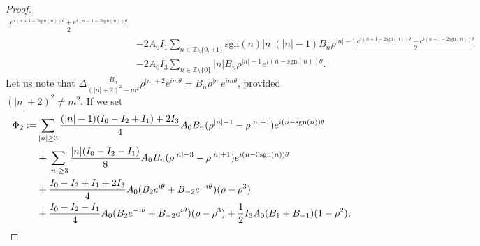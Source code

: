 \documentclass[10pt,a4paper]{amsart}
\begin{document}
\begin{proof}
\begin{equation*}
\begin{split}
\frac{e^{i(n+1-2\text{sgn}(n))\theta}+e^{i(n-1-2\text{sgn}(n))\theta}}{2}\\
&-2A_0I_1\sum_{n\in\mathbb{Z}\setminus\{0,\pm1\}}\text{sgn}(n)|n|(|n|-1)B_n\rho^{|n|-1}
\frac{e^{i(n+1-2\text{sgn}(n))\theta}-e^{i(n-1-2\text{sgn}(n))\theta}}{2}\\
&-2A_0I_3\sum_{n\in\mathbb{Z}\setminus\{0\}}|n|B_n\rho^{|n|-1}e^{i(n-\text{sgn}(n))\theta}.
\end{split}
\end{equation*}
Let us note that  $ \Delta \frac{B_n}{(|n|+2)^2-m^2}\rho^{|n|+2}e^{im\theta}=B_n\rho^{|n|}e^{im\theta}  $, provided $(|n|+2)^2\ne m^2$. 
If we set  
 \begin{align}\label{eq:Phi2}
 \Phi_2:=&\sum_{|n|\ge3}\frac{(|n|-1)(I_0-I_2+I_1)+2I_3}{4}A_0B_n
 (\rho^{|n|-1}-\rho^{|n|+1})e^{i(n-\text{sgn} (n))\theta}\notag\\
 &+\sum_{|n|\ge3}\frac{|n|(I_0-I_2-I_1)}{8}A_0B_n
 (\rho^{|n|-3}-\rho^{|n|+1})e^{i(n-3\text{sgn} (n))\theta}\notag\\
 &+\frac{I_0-I_2+I_1+2I_3}{4}A_0(B_2e^{i\theta}+B_{-2}e^{-i\theta})(\rho-\rho^3)\notag\\
 &+\frac{I_0-I_2-I_1}{4}A_0(B_2e^{-i\theta}+B_{-2}e^{i\theta})(\rho-\rho^3)
 +\frac12I_3A_0(B_1+B_{-1})(1-\rho^2), 
 \end{align}

\end{proof}
\end{document}
